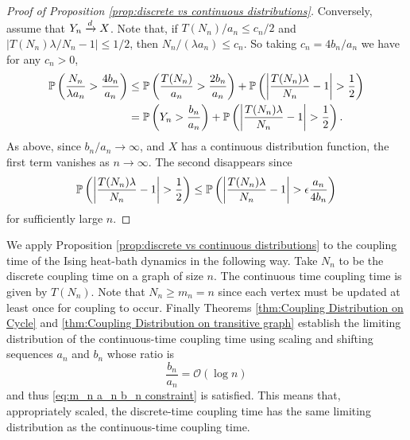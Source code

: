 \begin{proof}[Proof of Proposition \ref{prop:discrete vs continuous distributions}]
		Conversely, assume that $Y_n \xrightarrow{d} X$. Note that, if $T(N_n)/a_n \leq c_n/2$ and $|T(N_n) \lambda / N_n - 1| \leq 1/2$, then $N_n / (\lambda a_n )\leq c_n$. So taking $c_n = 4b_n/a_n$ we have for any $c_n > 0$,
		\begin{align}
			\mathbb{P}\left(\frac{N_n}{\lambda a_n} > \frac{4 b_n}{a_n} \right) &\leq \mathbb{P}\left(\frac{T(N_n)}{a_n} > \frac{2 b_n}{a_n}\right) + \mathbb{P}\left(\left|\frac{T(N_n)\lambda}{N_n} - 1\right| > \frac{1}{2}\right)\\
			&= \mathbb{P}\left(Y_n > \frac{b_n}{a_n}\right) + \mathbb{P}\left(\left|\frac{T(N_n)\lambda}{N_n} - 1\right| > \frac{1}{2}\right).
		\end{align}
		As above, since $b_n/a_n \rightarrow \infty$, and $X$ has a continuous distribution function, 
		the first term vanishes as $n \rightarrow \infty$. The second disappears since 
		\begin{equation}
			\mathbb{P}\left(\left|\frac{T(N_n)\lambda}{N_n} - 1\right| > \frac{1}{2}\right) \leq \mathbb{P}\left(\left|\frac{T(N_n)\lambda}{N_n} - 1\right| > \epsilon\frac{a_n}{4 b_n} \right)
		\end{equation}
		for sufficiently large $n$.
	\end{proof}


	\begin{remark}
		We apply Proposition \ref{prop:discrete vs continuous distributions} to the coupling time of the Ising heat-bath dynamics in the following way. Take $N_n$ to be the discrete coupling time on a graph of size $n$. The continuous time coupling time is given by $T(N_n)$. Note that $N_n \geq m_n = n$ since each vertex must be updated at least once for coupling to occur. Finally Theorems \ref{thm:Coupling Distribution on Cycle} and \ref{thm:Coupling Distribution on transitive graph} establish the limiting distribution of the continuous-time coupling time using scaling and shifting sequences $a_n$ and $b_n$ whose ratio is 
		\begin{equation}
			\frac{b_n}{a_n} = \mathcal{O}(\log n)
		\end{equation}
		and thus \eqref{eq:m_n a_n b_n constraint} is satisfied. This means that, appropriately scaled, the discrete-time coupling time has the same limiting distribution as the continuous-time coupling time.
	\end{remark}
	
